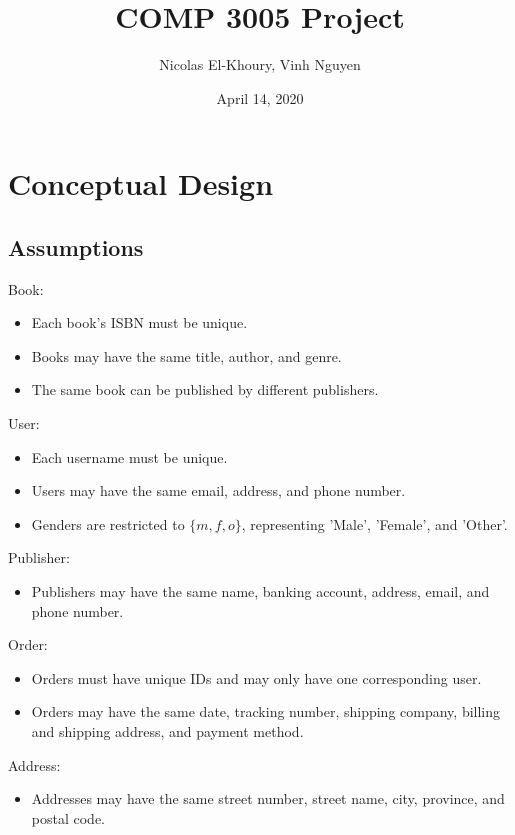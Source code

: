\documentclass{article}
\title{COMP 3005 Project}
\author{Nicolas El-Khoury, Vinh Nguyen}
\date{April 14, 2020}
\begin{document}
    \maketitle

    \section{Conceptual Design}

        \subsection{Assumptions}
    
        Book:
        \begin{itemize}
            \item Each book's ISBN must be unique.
            \item Books may have the same title, author, and genre.
            \item The same book can be published by different publishers.
        \end{itemize}
        
        \noindent User:
        \begin{itemize}
            \item Each username must be unique.
            \item Users may have the same email, address, and phone number.
            \item Genders are restricted to $\{m, f, o\}$, representing 'Male', 'Female', and 'Other'.
        \end{itemize}
        
        \noindent Publisher:
        \begin{itemize}
            \item Publishers may have the same name, banking account, address, email, and phone number.
        \end{itemize}
        
        \noindent Order:
        \begin{itemize}
            \item Orders must have unique IDs and may only have one corresponding user.
            \item Orders may have the same date, tracking number, shipping company, billing and shipping address, and payment method.
        \end{itemize}
        
        \noindent Address:
        \begin{itemize}
            \item Addresses may have the same street number, street name, city, province, and postal code.
        \end{itemize}
        
\end{document}

